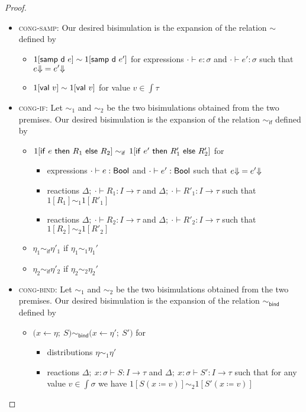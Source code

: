 \begin{proof}
\begin{itemize}
\item \textsc{cong-samp}: Our desired bisimulation is the expansion of the relation $\sim$ defined by
\begin{itemize}
\item $1[\mathsf{samp} \ \mathsf{d} \ e] \sim 1[\mathsf{samp} \ \mathsf{d} \ e']$ for expressions $\cdot \vdash e : \sigma$ and $\cdot \vdash e' : \sigma$ such that ${e \hspace{-2.5pt} \Downarrow} = {e' \hspace{-2.5pt} \Downarrow}$
\item $1[\mathsf{val} \ v] \sim 1[\mathsf{val} \ v]$ for value $v \in \int{\tau}$
\end{itemize}
\item \textsc{cong-if}: Let $\sim_1$ and $\sim_2$ be the two bisimulations obtained from the two premises. Our desired bisimulation is the expansion of the relation $\sim_\mathsf{if}$ defined by
\begin{itemize}
\item $1[\mathsf{if} \ e \ \mathsf{then} \ R_1 \ \mathsf{else} \ R_2] \sim_\mathsf{if} \, 1[\mathsf{if} \ e' \ \mathsf{then} \ R'_1 \ \mathsf{else} \ R'_2]$ for 
\begin{itemize}
\item expressions $\cdot \vdash e : \mathsf{Bool}$ and $\cdot \vdash e' : \mathsf{Bool} $ such that ${e \hspace{-2.5pt} \Downarrow} = {e' \hspace{-2.5pt} \Downarrow}$
\item reactions $\Delta; \ \cdot \vdash R_1 : I \to \tau$ and $\Delta; \ \cdot \vdash R'_1 : I \to \tau$ such that $1[R_1] \sim_1 1[R'_1]$
\item reactions $\Delta; \ \cdot \vdash R_2 : I \to \tau$ and $\Delta; \ \cdot \vdash R'_2 : I \to \tau$ such that $1[R_2] \sim_2 1[R'_2]$
\end{itemize}
\item $\eta_1 \sim_\mathsf{if} \eta'_1$ if $\eta_1 \sim_1 \eta_1'$
\item $\eta_2 \sim_\mathsf{if} \eta'_2$ if $\eta_2 \sim_2 \eta_2'$
\end{itemize}
\item \textsc{cong-bind}: Let $\sim_1$ and $\sim_2$ be the two bisimulations obtained from the two premises. Our desired bisimulation is the expansion of the relation $\sim_\mathsf{bind}$ defined by
\begin{itemize}
\item $\big(x \leftarrow \eta; \ S\big) \sim_\mathsf{bind} \big(x \leftarrow \eta'; \ S'\big)$ for
\begin{itemize}
\item distributions $\eta \sim_1 \eta'$
\item reactions $\Delta; \ x : \sigma \vdash S : I \to \tau$ and $\Delta; \ x : \sigma \vdash S' : I \to \tau$ such that for any value $v \in \int{\sigma}$ we have $1[S(x \coloneqq v)] \sim_2 1[S'(x \coloneqq v)]$

\end{itemize}
\end{itemize}
\end{itemize}
\end{proof}
